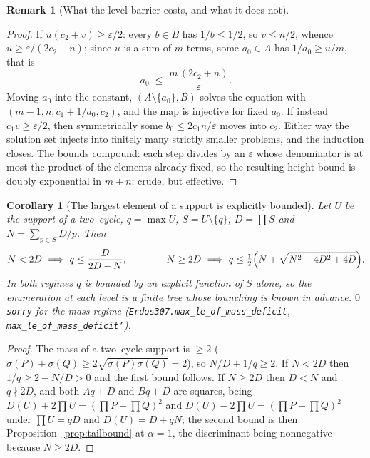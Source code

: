 \documentclass[11pt]{article}
\newtheorem{corollary}[theorem]{Corollary}
\theoremstyle{definition}
\newtheorem{remark}[theorem]{Remark}
\begin{document}
\begin{remark}[What the level barrier costs, and what it does not]
\begin{proof}
If $u(c_2+v)\ge\varepsilon/2$: every $b\in B$ has $1/b\le1/2$, so $v\le n/2$, whence
$u\ge\varepsilon/(2c_2+n)$; since $u$ is a sum of $m$ terms, some $a_0\in A$ has
$1/a_0\ge u/m$, that is
\[ a_0\;\le\;\frac{m\,(2c_2+n)}{\varepsilon}. \]
Moving $a_0$ into the constant, $(A\setminus\{a_0\},B)$ solves the equation with
$(m-1,n,c_1+1/a_0,c_2)$, and the map is injective for fixed $a_0$. If instead
$c_1v\ge\varepsilon/2$, then symmetrically some $b_0\le2c_1n/\varepsilon$ moves into $c_2$. Either
way the solution set injects into finitely many strictly smaller problems, and the induction closes.
The bounds compound: each step divides by an $\varepsilon$ whose denominator is at most the product
of the elements already fixed, so the resulting height bound is doubly exponential in $m+n$; crude,
but effective.
\end{proof}

\begin{corollary}[The largest element of a support is explicitly bounded]\label{cor:maxbound}
Let $U$ be the support of a two--cycle, $q=\max U$, $S=U\setminus\{q\}$, $D=\prod S$ and
$N=\sum_{p\in S}D/p$. Then
\[ N<2D\ \Longrightarrow\ q\le\frac{D}{2D-N},
   \qquad\qquad N\ge2D\ \Longrightarrow\ q\le\tfrac12\Bigl(N+\sqrt{N^{2}-4D^{2}+4D}\Bigr). \]
In both regimes $q$ is bounded by an explicit function of $S$ alone, so the enumeration at each
level is a finite tree whose branching is known in advance. $0$ \texttt{sorry} for the mass regime
\textup{(\texttt{Erdos307.max\_le\_of\_mass\_deficit}, \texttt{max\_le\_of\_mass\_deficit'})}.
\end{corollary}
\begin{proof}
The mass of a two--cycle support is $\ge2$ \textup{(}$\sigma(P)+\sigma(Q)\ge2\sqrt{\sigma(P)\sigma(Q)}=2$\textup{)},
so $N/D+1/q\ge2$. If $N<2D$ then $1/q\ge2-N/D>0$ and the first bound follows. If $N\ge2D$ then
$D<N$ and $q\nmid2D$, and both $Aq+D$ and $Bq+D$ are squares, being $D(U)+2\prod U=(\prod P+\prod
Q)^2$ and $D(U)-2\prod U=(\prod P-\prod Q)^2$ under $\prod U=qD$ and $D(U)=D+qN$; the second bound
is then Proposition~\ref{prop:tailbound} at $\alpha=1$, the discriminant being nonnegative because
$N\ge2D$.
\end{proof}


\end{remark}
\end{document}
